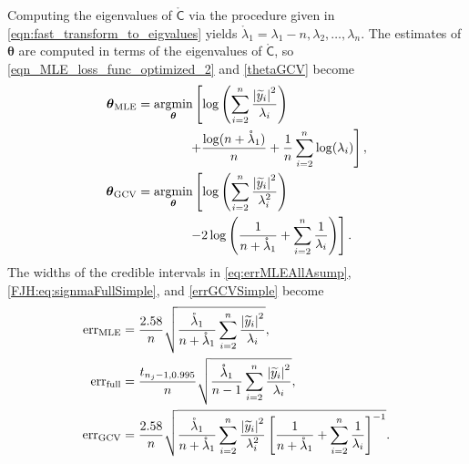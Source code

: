 \documentclass[twocolumn]{svjour3}          %
\newcommand{\bm}[1]{\boldsymbol{#1}}
\newcommand{\rlambda}{\mathring{\lambda}}
\newcommand{\vtheta}{{\bm{\theta}}}
\newcommand{\rmC}{\mathring{\mathsf{C}}}
\newcommand{\MLE}{\text{MLE}}
\newcommand{\err}{\textup{err}}
\def\abs#1{\ensuremath{\left \lvert #1 \right \rvert}}
\providecommand{\argmin}{\operatorname*{argmin}}
\begin{document}
Computing the eigenvalues of $\rmC$ via the procedure given in \eqref{eqn:fast_transform_to_eigvalues} yields $\rlambda_1 = \lambda_1 - n, \lambda_2, \ldots, \lambda_n$. The estimates of $\vtheta$ are computed in terms of the eigenvalues of $\rmC$, so \eqref{eqn_MLE_loss_func_optimized_2} and \eqref{thetaGCV} become
\begin{align}
\nonumber
\vtheta_\MLE
&= 
\argmin_{\vtheta}
\left[
\log\left(
\sum_{i=2}^n \frac{\abs{\widetilde{y}_i}^2}{\lambda_i}
\right) 
\right . \\
&
\qquad \qquad   \left . + 
\frac{\log(n + \rlambda_1)}{n} + \frac{1}{n}\sum_{i=2}^n \log(\lambda_i)
\right], \\
\nonumber
\vtheta_{\textup{GCV}} 
&= \argmin_\vtheta \left[ \log \left ( \sum_{i=2}^n \frac{\abs{\widetilde{y}_i}^2}{\lambda_i^2} 
\right) \right .\\
& \qquad \qquad  \left . -2\log\left(\frac 1{n+\rlambda_1} + \sum_{i=2}^n \frac{1}{\lambda_i} \right)
\right].
\end{align}
The widths of the credible intervals in \eqref{eq:errMLEAllAsump}, \eqref{FJH:eq:signmaFullSimple}, and   \eqref{errGCVSimple} become
\begin{subequations}
\label{fastStoppingCriterions}
	\begin{align}
\err_\MLE  &
=
\frac{2.58}{n}\sqrt{
	\frac{\rlambda_1}{n + \rlambda_1}
	\sum_{i=2}^{n} \frac{\abs{\widetilde{y}_i}^2}{\lambda_i}  
}, 
\\
\err_{\textup{full}} 
& = \frac{t_{n_j-1,0.995}}{n} \sqrt{
	\frac{\rlambda_1}{n-1} \sum_{i=2}^n \frac{\abs{\widetilde{y}_i}^2}{\lambda_i}
}, \\
\err_{\textup{GCV}} & =
\frac{2.58}{n}\sqrt{	\frac{\rlambda_1}{n + \rlambda_1} \sum_{i=2}^n \frac{\abs{\widetilde{y}_i}^2}{\lambda_i^2}  \left [ \frac{1}{n + \rlambda_1} + \sum_{i=2}^n \frac{1}{\lambda_i} \right]^{-1}} .
	\end{align}
\end{subequations}
\end{document}
